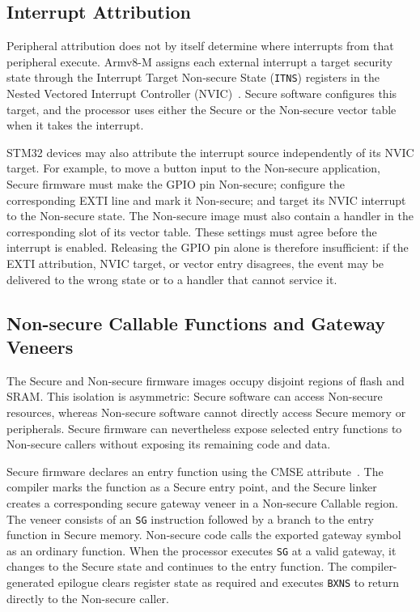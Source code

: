 \documentclass[sigconf]{acmart}
\begin{document}
\subsection{Interrupt Attribution}

Peripheral attribution does not by itself determine where interrupts from that peripheral execute.
Armv8-M assigns each external interrupt a target security state through the Interrupt Target Non-secure State (\texttt{ITNS}) registers in the Nested Vectored Interrupt Controller (NVIC)~\cite{armTrustZoneM}.
Secure software configures this target, and the processor uses either the Secure or the Non-secure vector table when it takes the interrupt.

STM32 devices may also attribute the interrupt source independently of its NVIC target.
For example, to move a button input to the Non-secure application, Secure firmware must make the GPIO pin Non-secure; configure the corresponding EXTI line and mark it Non-secure; and target its NVIC interrupt to the Non-secure state.
The Non-secure image must also contain a handler in the corresponding slot of its vector table.
These settings must agree before the interrupt is enabled.
Releasing the GPIO pin alone is therefore insufficient: if the EXTI attribution, NVIC target, or vector entry disagrees, the event may be delivered to the wrong state or to a handler that cannot service it.

\subsection{Non-secure Callable Functions and Gateway Veneers}

The Secure and Non-secure firmware images occupy disjoint regions of flash and SRAM.
This isolation is asymmetric: Secure software can access Non-secure resources, whereas Non-secure software cannot directly access Secure memory or peripherals.
Secure firmware can nevertheless expose selected entry functions to Non-secure callers without exposing its remaining code and data.

Secure firmware declares an entry function using the CMSE  attribute~\cite{armCmse}.
The compiler marks the function as a Secure entry point, and the Secure linker creates a corresponding secure gateway veneer in a Non-secure Callable region.
The veneer consists of an \texttt{SG} instruction followed by a branch to the entry function in Secure memory.
Non-secure code calls the exported gateway symbol as an ordinary function.
When the processor executes \texttt{SG} at a valid gateway, it changes to the Secure state and continues to the entry function.
The compiler-generated epilogue clears register state as required and executes \texttt{BXNS} to return directly to the Non-secure caller.
\end{document}
